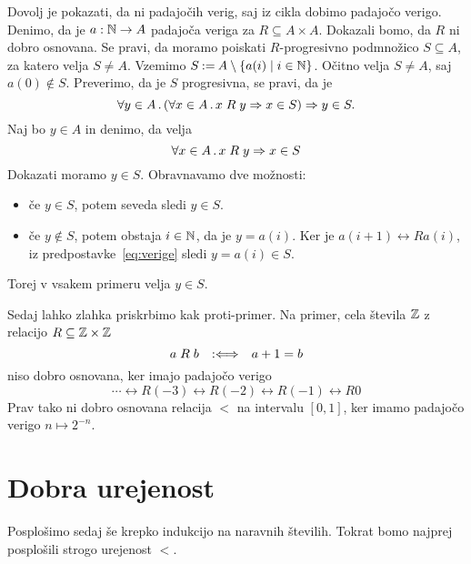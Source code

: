 \begin{dokaz}
  Dovolj je pokazati, da ni padajočih verig, saj iz cikla dobimo padajočo verigo.
  Denimo, da je $a : \mathbb{N} \to A$ padajoča veriga za $R \subseteq A \times A$. Dokazali bomo, da $R$ ni dobro
  osnovana. Se pravi, da moramo poiskati $R$-progresivno podmnožico $S \subseteq A$, za katero velja
  $S \neq A$. Vzemimo $S \mathbin{{:}{=}} A \setminus \left\{ a(i) \mid i \in \mathbb{N}\right\}$. Očitno velja $S \neq A$, saj 
  $a(0) \not\in S$. Preverimo, da je $S$ progresivna, se pravi, da je
  \begin{equation*}
    \forall y \in A \,.\, (\forall x \in A \,.\, x \mathrel{R} y \Rightarrow x \in S) \Rightarrow y \in S.
  \end{equation*}
  Naj bo $y \in A$ in denimo, da velja
  \begin{equation}
    \label{eq:verige}
    \forall x \in A \,.\, x \mathrel{R} y \Rightarrow x \in S
  \end{equation}
  Dokazati moramo $y \in S$. Obravnavamo dve možnosti:
  \begin{itemize}
  \item če $y \in S$, potem seveda sledi $y \in S$.
  \item če $y \not\in S$, potem obstaja $i \in \mathbb{N}$, da je $y = a(i)$. Ker je $a(i+1) \rel{R} a(i)$, iz
    predpostavke~\eqref{eq:verige} sledi $y = a(i) \in S$.
  \end{itemize}
  Torej v vsakem primeru velja $y \in S$.
\end{dokaz}

\begin{primer}
  Sedaj lahko zlahka priskrbimo kak proti-primer. Na primer, cela števila $\mathbb{Z}$ z relacijo $R \subseteq \mathbb{Z} \times \mathbb{Z}$
  \begin{equation*}
    a \mathrel{R} b \quad {{:}{\Longleftrightarrow}}\quad a + 1 = b
  \end{equation*}
  niso dobro osnovana, ker imajo padajočo verigo
  \begin{equation*}
    \cdots \rel{R} (-3) \rel{R} (-2) \rel{R} (-1) \rel{R} 0
  \end{equation*}
  Prav tako ni dobro osnovana relacija $<$ na intervalu $[0,1]$, ker imamo padajočo verigo
  $n \mapsto 2^{-n}$.
\end{primer}

\section{Dobra urejenost}

Posplošimo sedaj še krepko indukcijo na naravnih številih. Tokrat bomo najprej posplošili
strogo urejenost $<$.

